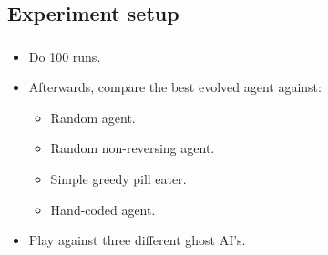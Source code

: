 \documentclass{beamer}
\makeatletter
\newcommand*{\currentname}{\@currentlabelname}
\makeatother
\begin{document}
\subsection{Experiment setup}
\begin{frame}
\frametitle{\currentname}

\begin{itemize}
	\item Do 100 runs.
	\item Afterwards, compare the best evolved agent against:
	\begin{itemize}
		\item Random agent.
		\item Random non-reversing agent.
		\item Simple greedy pill eater.
		\item Hand-coded agent.
	\end{itemize}
	\item Play against three different ghost AI's.
	
\end{itemize}
\end{frame}
\end{document}

